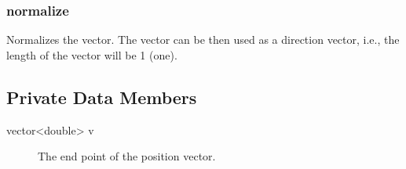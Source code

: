 \subsubsection{normalize}
Normalizes the vector. The vector can be then used as a direction
vector, i.e., the length of the vector will be 1 (one).

\subsection{Private Data Members}
\begin{description}
 \item [vector<double> v] The end point of the position vector.

 \end{description} 



